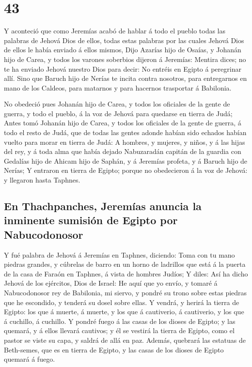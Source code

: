 \hypertarget{section-42}{%
\section{43}\label{section-42}}

 Y aconteció que como Jeremías acabó de hablar á todo el
pueblo todas las palabras de Jehová Dios de ellos, todas estas palabras
por las cuales Jehová Dios de ellos le había enviado á ellos mismos,
 Dijo Azarías hijo de Osaías, y Johanán hijo de Carea, y
todos los varones soberbios dijeron á Jeremías: Mentira dices; no te ha
enviado Jehová nuestro Dios para decir: No entréis en Egipto á
peregrinar allí.  Sino que Baruch hijo de Nerías te incita
contra nosotros, para entregarnos en mano de los Caldeos, para matarnos
y para hacernos trasportar á Babilonia.

 No obedeció pues Johanán hijo de Carea, y todos los
oficiales de la gente de guerra, y todo el pueblo, á la voz de Jehová
para quedarse en tierra de Judá;  Antes tomó Johanán hijo
de Carea, y todos los oficiales de la gente de guerra, á todo el resto
de Judá, que de todas las gentes adonde habían sido echados habían
vuelto para morar en tierra de Judá:  A hombres, y
mujeres, y niños, y á las hijas del rey, y á toda alma que había dejado
Nabuzaradán capitán de la guardia con Gedalías hijo de Ahicam hijo de
Saphán, y á Jeremías profeta, y á Baruch hijo de Nerías; 
Y entraron en tierra de Egipto; porque no obedecieron á la voz de
Jehová: y llegaron hasta Taphnes.

\hypertarget{en-thachpanches-jeremuxedas-anuncia-la-inminente-sumisiuxf3n-de-egipto-por-nabucodonosor}{%
\subsection{En Thachpanches, Jeremías anuncia la inminente sumisión de
Egipto por
Nabucodonosor}\label{en-thachpanches-jeremuxedas-anuncia-la-inminente-sumisiuxf3n-de-egipto-por-nabucodonosor}}

 Y fué palabra de Jehová á Jeremías en Taphnes, diciendo:
 Toma con tu mano piedras grandes, y cúbrelas de barro en
un horno de ladrillos que está á la puerta de la casa de Faraón en
Taphnes, á vista de hombres Judíos;  Y diles: Así ha
dicho Jehová de los ejércitos, Dios de Israel: He aquí que yo envío, y
tomaré á Nabucodonosor rey de Babilonia, mi siervo, y pondré su trono
sobre estas piedras que he escondido, y tenderá su dosel sobre ellas.
 Y vendrá, y herirá la tierra de Egipto: los que á
muerte, á muerte, y los que á cautiverio, á cautiverio, y los que á
cuchillo, á cuchillo.  Y pondré fuego á las casas de los
dioses de Egipto; y las quemará, y á ellos llevará cautivos; y él se
vestirá la tierra de Egipto, como el pastor se viste su capa, y saldrá
de allá en paz.  Además, quebrará las estatuas de
Beth-semes, que es en tierra de Egipto, y las casas de los dioses de
Egipto quemará á fuego.

